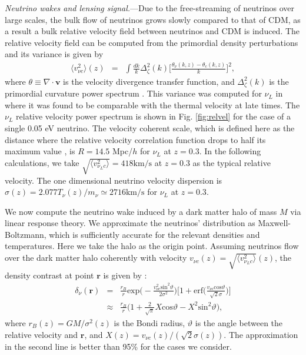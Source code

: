 \documentclass[aps,prl,twocolumn,showpacs,superscriptaddress,groupedaddress,nofootinbib]{revtex4}  %
\newcommand{\mr}{\mathrm}
\begin{document}
{\it Neutrino wakes and lensing signal.}---Due to the free-streaming of 
neutrinos over large scales, the bulk flow of neutrinos grows slowly compared
to that of CDM,
as a result a bulk relative velocity field between neutrinos and 
CDM is induced.
The relative velocity field can be computed from the primordial density
perturbations and its variance is given by 
\begin{eqnarray}
\label{v_nuc}
\langle v^2_{\nu c}\rangle(z)
&=& \int \frac{dk}{k}\Delta^2_{\zeta}(k)\bigg[ \frac{\theta_\nu (k, z) - \theta_c (k, z)}{k} \bigg]^2, 
\end{eqnarray}
where $\theta\equiv\nabla\cdot{\bm v}$ is the velocity divergence
transfer function, and $\Delta^2_\zeta(k)$ is the primordial curvature
power spectrum \cite{Zhu:2013}.
This variance was computed for $\nu_L$ in \cite{Zhu:2013} where it was
found to be comparable with the thermal velocity at late times. The $\nu_L$
relative velocity power spectrum is shown in Fig. \ref{fig:relvel} for the
case of a single 0.05 eV neutrino.
The velocity coherent scale, which is defined here as the distance where 
the relative velocity correlation function drops to half its maximum value 
\cite{Zhu:2013},
is $R=14.5$ Mpc/$h$ for $\nu_L$ at $z=0.3$. 
In the following calculations, 
we take $\sqrt{\langle v^2_{\nu_L c}\rangle}=418\mr{km/s}$ at $z=0.3$ 
as the typical relative velocity. The one dimensional neutrino velocity 
dispersion is $\sigma(z)=2.077T_{\nu}(z)/m_\nu\simeq2716\mr{km/s}$ 
for $\nu_L$ at $z=0.3$.

We now compute the neutrino wake induced by a dark matter halo of
mass $M$ via linear response theory. 
We approximate the neutrinos' distribution as Maxwell-Boltzmann, 
which is sufficiently accurate for the relevant densities and temperatures.
Here we take the halo as the origin point.
Assuming neutrinos
flow over the dark matter halo coherently with velocity $v_{\nu c}(z)
=\sqrt{\langle v^2_{\nu_L c}\rangle}(z)$, the density contrast at point
$\bm{r}$ is given by \cite{Binney:2008}:
\begin{eqnarray}
  \label{delta_nu}
  \delta_\nu(\bm{r})
  &=&\frac{r_B}{r}
  \mr{exp}\bigg(-\frac{v_{\nu c}^2\mr{sin}^2\vartheta}{2\sigma^2}\bigg)
  \bigg[1+\mr{erf}\bigg(\frac{v_{\nu
      c}\mr{cos}\vartheta}{\sqrt{2}\sigma}\bigg)\bigg] \nonumber \\
  &\approx&\frac{r_B}{r}
  \bigg(1+\frac{2}{\sqrt{\pi}}X\mr{cos}\vartheta-X^2\mr{sin}^2\vartheta\bigg),
\end{eqnarray}
where $r_B(z) = GM/\sigma^2(z)$ is the Bondi radius, $\vartheta$ is the
angle between the relative velocity and $\bm{r}$, and $X(z)=v_{\nu
  c}(z)/(\sqrt{2}\sigma(z))$. The approximation in 
the second line is better than 95\% for the cases we consider.
\end{document}
